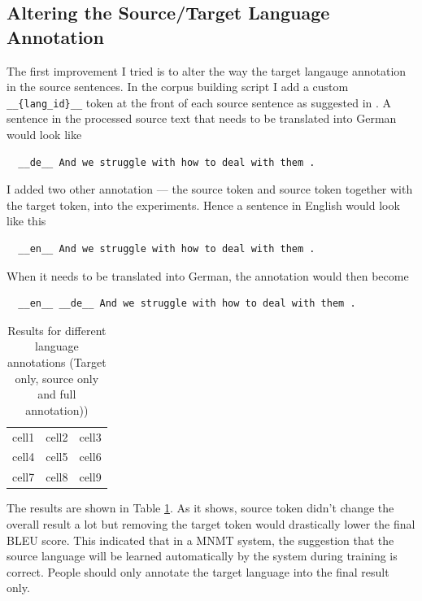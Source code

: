 \documentclass[thesis,fonts=libertine]{cluu}
\begin{document}
\subsection{Altering the Source/Target Language Annotation}

The first improvement I tried is to alter the way the target langauge annotation in the source sentences. In the corpus building script I add a custom \verb|__{lang_id}__| token at the front of each source sentence as suggested in \cite{Johnson:2016aa}. A sentence in the processed source text that needs to be translated into German would look like 

\begin{verbatim}
  __de__ And we struggle with how to deal with them .
\end{verbatim}

I added two other annotation --- the source token and source token together with the target token, into the experiments. Hence a sentence in English would look like this 

\begin{verbatim}
  __en__ And we struggle with how to deal with them .
\end{verbatim}

When it needs to be translated into German, the annotation would then become 

\begin{verbatim}
  __en__ __de__ And we struggle with how to deal with them .
\end{verbatim}

\begin{table}
  \centering
  \begin{tabular}{c c c}
    cell1 & cell2 & cell3 \\ 
    cell4 & cell5 & cell6 \\  
    cell7 & cell8 & cell9 
  \end{tabular}
  \caption{Results for different language annotations (Target only, source only and full annotation))}
  \label{table:altering_lang_id}
\end{table}

The results are shown in Table \ref{table:altering_lang_id}. As it shows, source token didn't change the overall result a lot but removing the target token would drastically lower the final BLEU score. This indicated that in a MNMT system, the suggestion that the source language will be learned automatically by the system during training is correct. People should only annotate the target language into the final result only.
\end{document}

